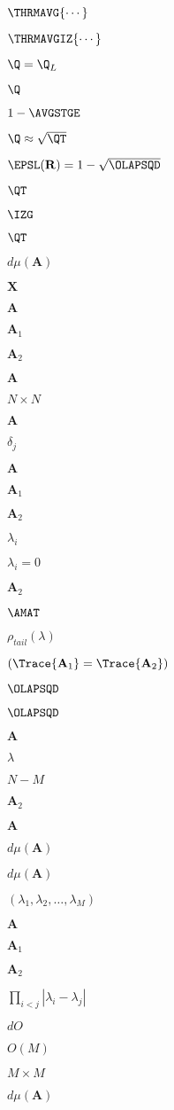 $\THRMAVG{\cdots}$

$\THRMAVGIZ{\cdots}$

$\Q=\Q_{L}$

$\Q$

$1-\AVGSTGE$

$ \Q \approx \sqrt{\QT} $

$\EPSL(\mathbf{R}) = 1 - \sqrt{\OLAPSQD}$

$\QT$

$\IZG$

$\QT$

$d\mu(\mathbf{A})$

$\mathbf{X}$

$\mathbf{A}$

$\mathbf{A}_{1}$

$\mathbf{A}_{2}$

$\mathbf{A}$

$N\times N$

$\mathbf{A}$

$\delta_{j}$

$\mathbf{A}$

$\mathbf{A}_{1}$

$\mathbf{A}_{2}$

$\lambda_{i}$

$\lambda_{i}=0$

$\mathbf{A}_{2}$

$\AMAT$

$\rho_{tail}(\lambda)$

$(\Trace{\mathbf{A}_{1}}=\Trace{\mathbf{A}_{2}})$

$\OLAPSQD$

$\OLAPSQD$

$\mathbf{A}$

$\lambda$

$N-M$

$\mathbf{A}_{2}$

$\mathbf{A}$

$d\mu(\mathbf{A})$

$d\mu(\mathbf{A})$

$( \lambda_1, \lambda_2, \ldots, \lambda_M)$

$\mathbf{A}$

$\mathbf{A}_{1}$

$\mathbf{A}_{2}$

$ \prod_{i < j} |\lambda_i - \lambda_j| $

$dO$

$O(M)$

$M\times M$

$d\mu(\mathbf{A})$

